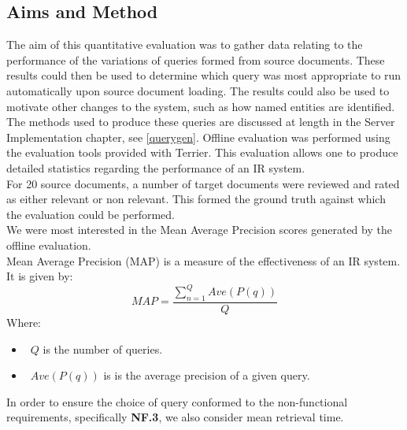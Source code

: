 \documentclass{l4proj}
\begin{document}
\subsection{Aims and Method}
The aim of this quantitative evaluation was to gather data relating to the performance of the variations of queries formed from source documents. These results could then be used to determine which query was most appropriate to run automatically upon source document loading. The results could also be used to motivate other changes to the system, such as how named entities are identified.\\
The methods used to produce these queries are discussed at length in the Server Implementation chapter, see \ref{querygen}.
Offline evaluation was performed using the evaluation tools provided with Terrier. This evaluation allows one to produce detailed statistics regarding the performance of an IR system.\\
For 20 source documents, a number of target documents were reviewed and rated as either relevant or non relevant. This formed the ground truth against which the evaluation could be performed.\\
We were most interested in the Mean Average Precision scores generated by the offline evaluation.\\
Mean Average Precision (MAP) is a measure of the effectiveness of an IR system.
It is given by:
\begin{displaymath}
  MAP=\frac{\sum_{n=1}^{Q} Ave(P(q))}{Q}
\end{displaymath}
Where: 
\begin{itemize}
\item{~$Q$ is the number of queries.}
\item{~$Ave(P(q))$ is is the average precision of a given query.}
\end{itemize}

In order to ensure the choice of query conformed to the non-functional requirements, specifically \textbf{NF.3}, we also consider mean retrieval time.
\end{document}
